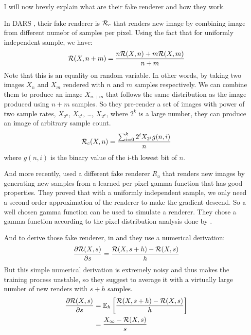 \documentclass{classeENS}
\begin{document}
I will now brevly explain what are their fake renderer and how they work.

\par In DARS \cite{kuznetsov2018deep}, their fake renderer is $\mathcal R_{c}$ that renders 
new image by combining image from different numebr of samples per pixel. Using the fact that 
for uniformly independent sample, we have:
\[ \mathcal R(X,n+m) = \frac{n\mathcal R(X,n) + m\mathcal R(X,m)}{n+m} \]
Note that this is an equality on random variable. In other words, by taking two 
images $X_n$ and $X_m$ rendered with $n$ and $m$ samples 
respectively. We can combine them to produce an image $X_{n+m}$ that follows the same 
distribution as the image produced using $n+m$ samples.
So they  pre-render a set of images with power of two sample rates, $X_{2^0}$, $X_{2^1}$, \dots, $X_{2^k}$, 
where $2^k$ is a large number, they can produce an image of arbitrary sample count.
\begin{equation}
    \label{eq:3}
    \mathcal R_c(X,n) = \frac{\sum_{i=0}^k 2^i X_{2^i} g(n,i)}{n}
\end{equation}
where $g(n,i)$ is the binary value of the i-th lowest bit of $n$.

\par And more recently, \cite{10.1145/3550454.3555515} used a different fake 
  renderer $R_{a}$ that renders new images by generating
  new samples from a learned per pixel gamma function that has good properties. They proved
  that with a uniformly independent sample, we only need a second order 
  approximation of the renderer to make the gradient descend. So a well 
  chosen gamma function can be used to simulate a renderer. They chose a 
  gamma function according to the pixel distribution analysis done by 
  \cite{elek2019learning}.

\par And to derive those fake renderer, in \cite{kuznetsov2018deep} and
\cite{10.1145/3550454.3555515} they use a numerical derivation:
  \[ \frac{\partial \mathcal R(X,s)}{\partial s} = \frac{\mathcal R(X,s+h) - \mathcal R(X,s)}{h}\]
  But this simple numerical derivation is extremely noisy and thus makes the 
  training process unstable, so they suggest to average 
  it with a virtually large number of new renders with $s+h$ samples.
  \begin{align}
      \label{eq:4}
      \frac{\partial \mathcal R(X,s)}{\partial s} & = \mathbb E_h \left [\frac{\mathcal R(X,s+h) - \mathcal R(X,s)}{h} \right ] \\
      & = \frac{X_\infty - \mathcal R(X,s)}{s}
  \end{align}
\end{document}
